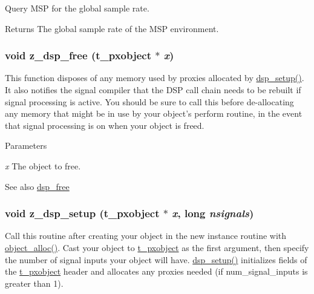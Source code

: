 Query MSP for the global sample rate. \begin{DoxyReturn}{Returns}
The global sample rate of the MSP environment. 
\end{DoxyReturn}
\hypertarget{group__msp_ga85762f03c915d3860f526a8bf4dd1f3f}{
\subsubsection[{z\_\-dsp\_\-free}]{\setlength{\rightskip}{0pt plus 5cm}void z\_\-dsp\_\-free ({\bf t\_\-pxobject} $\ast$ {\em x})}}
\label{group__msp_ga85762f03c915d3860f526a8bf4dd1f3f}


This function disposes of any memory used by proxies allocated by \hyperlink{group__msp_gad15f054306792846a00a5f4e9e5426be}{dsp\_\-setup()}. It also notifies the signal compiler that the DSP call chain needs to be rebuilt if signal processing is active. You should be sure to call this before de-\/allocating any memory that might be in use by your object’s perform routine, in the event that signal processing is on when your object is freed.


\begin{DoxyParams}{Parameters}
\item[{\em x}]The object to free. \end{DoxyParams}
\begin{DoxySeeAlso}{See also}
\hyperlink{group__msp_ga9a981adf6eea7e55d11c1a0b02592a6e}{dsp\_\-free} 
\end{DoxySeeAlso}
\hypertarget{group__msp_ga5c4d70cfb420f13386dd1473143e5825}{
\subsubsection[{z\_\-dsp\_\-setup}]{\setlength{\rightskip}{0pt plus 5cm}void z\_\-dsp\_\-setup ({\bf t\_\-pxobject} $\ast$ {\em x}, \/  long {\em nsignals})}}
\label{group__msp_ga5c4d70cfb420f13386dd1473143e5825}


Call this routine after creating your object in the new instance routine with \hyperlink{group__obj_gacb89ef27c34b45e9037d877375804284}{object\_\-alloc()}. Cast your object to \hyperlink{structt__pxobject}{t\_\-pxobject} as the first argument, then specify the number of signal inputs your object will have. \hyperlink{group__msp_gad15f054306792846a00a5f4e9e5426be}{dsp\_\-setup()} initializes fields of the \hyperlink{structt__pxobject}{t\_\-pxobject} header and allocates any proxies needed (if num\_\-signal\_\-inputs is greater than 1).

